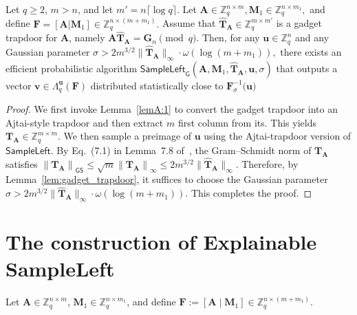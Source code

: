 \begin{lemma}
\label{ap:2}
Let $q \geq 2$, $m > n$, and let $m' = n\lceil \log q\rceil$.
Let
$
    \mathbf A \in \mathbb Z_q^{n \times m},
    \mathbf M_1 \in \mathbb Z_q^{n \times m_1},
$
and define
$
    \mathbf F = [\mathbf A | \mathbf M_1]
    \in \mathbb Z_q^{n \times (m+m_1)}.
$
Assume that $\widehat{\mathbf T}_{\mathbf A} \in \mathbb Z_q^{m \times m'}$
is a gadget trapdoor for $\mathbf A$, namely
$
    \mathbf A\widehat{\mathbf T}_{\mathbf A}
    =
    \mathbf G_n
    \pmod q .
$
Then, for any $\mathbf u \in \mathbb Z_q^n$ and any Gaussian parameter
$
    \sigma
    >
    2m^{3/2}\|\widehat{\mathbf T}_{\mathbf A}\|_{\infty}
    \cdot \omega(\log(m+m_1)),
$
there exists an efficient probabilistic algorithm
$
    \mathsf{SampleLeft}_{\mathsf{G}}
    (\mathbf A,\mathbf M_1,\widehat{\mathbf T}_{\mathbf A},\mathbf u,\sigma)
$
that outputs a vector
$
    \mathbf v \in \Lambda_q^{\mathbf u}(\mathbf F)
$
distributed statistically close to
$
    \mathbf{F}_\sigma^{-1}(\mathbf{u)}
$
\end{lemma}
\begin{proof}
We first invoke Lemma~\ref{lemA:1} to convert the gadget trapdoor into an
Ajtai-style trapdoor and then extract $m$ first column from its. This yields
$
    \mathbf{T}_{\mathbf A} \in \mathbb{Z}_q^{m \times m}.
$
We then sample a preimage of $\mathbf{u}$ using the Ajtai-trapdoor version of
$\mathsf{SampleLeft}$. By Eq.~(7.1) in Lemma~7.8 of~\cite{EPRINT:ChaHsiWu25}, the Gram--Schmidt norm
of $\mathbf{T}_{\mathbf A}$ satisfies
$
    \left\lVert \mathbf{T}_{\mathbf A} \right\rVert_{\mathsf{GS}}
    \leq
    \sqrt{m}
    \left\lVert \mathbf{T}_{\mathbf A} \right\rVert_{\infty}
    \leq
    2m^{3/2}
    \| \widehat{\mathbf{T}}_{\mathbf A} \|_{\infty}.
$
Therefore, by Lemma~\ref{lem:gadget_trapdoor}, it suffices to choose the Gaussian parameter
$ \sigma
    >
    2m^{3/2}
    \| \widehat{\mathbf{T}}_{\mathbf A} \|_{\infty}
    \cdot
    \omega\!\left(\log(m+m_1)\right).
$
This completes the proof.
\end{proof}

\section{The construction of Explainable SampleLeft}
\label{ap:3}

Let $\mathbf{A}\in\mathbb{Z}_q^{n\times m}$,
$\mathbf{M}_1\in\mathbb{Z}_q^{n\times m_1}$, and define
$
    \mathbf{F}:=[\mathbf{A}\mid \mathbf{M}_1]
    \in \mathbb{Z}_q^{n\times(m+m_1)} .
$

